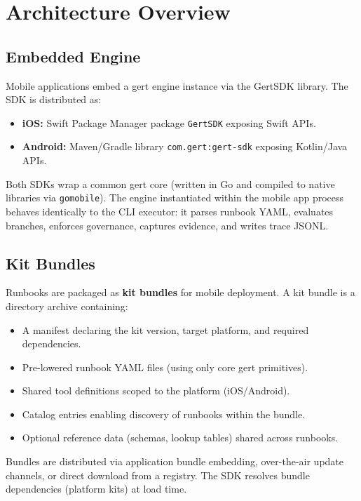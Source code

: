 \section{Architecture Overview}

\subsection{Embedded Engine}

Mobile applications embed a gert engine instance via the GertSDK library. The SDK is distributed as:

\begin{itemize}
  \item \textbf{iOS:} Swift Package Manager package \texttt{GertSDK} exposing Swift APIs.
  \item \textbf{Android:} Maven/Gradle library \texttt{com.gert:gert-sdk} exposing Kotlin/Java APIs.
\end{itemize}

Both SDKs wrap a common gert core (written in Go and compiled to native libraries via \texttt{gomobile}). The engine instantiated within the mobile app process behaves identically to the CLI executor: it parses runbook YAML, evaluates branches, enforces governance, captures evidence, and writes trace JSONL.

\subsection{Kit Bundles}

Runbooks are packaged as \textbf{kit bundles} for mobile deployment. A kit bundle is a directory archive containing:

\begin{itemize}
  \item A manifest declaring the kit version, target platform, and required dependencies.
  \item Pre-lowered runbook YAML files (using only core gert primitives).
  \item Shared tool definitions scoped to the platform (iOS/Android).
  \item Catalog entries enabling discovery of runbooks within the bundle.
  \item Optional reference data (schemas, lookup tables) shared across runbooks.
\end{itemize}

Bundles are distributed via application bundle embedding, over-the-air update channels, or direct download from a registry. The SDK resolves bundle dependencies (platform kits) at load time.

